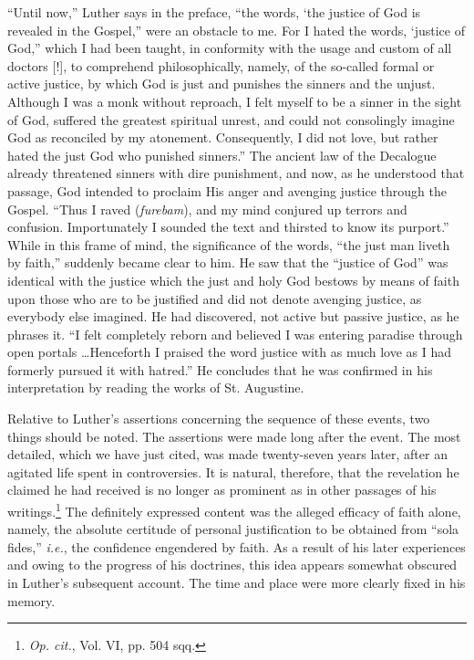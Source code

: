 “Until now,” Luther says in the preface, “the words, ‘the justice
of God is revealed in the Gospel,” were an obstacle to me. For I hated
the words, ‘justice of God,” which I had been taught, in conformity
with the usage and custom of all doctors [!], to comprehend philosophically,
namely, of the so-called formal or active justice, by which
God is just and punishes the sinners and the unjust. Although I was
a monk without reproach, I felt myself to be a sinner in the sight of
God, suffered the greatest spiritual unrest, and could not consolingly
imagine God as reconciled by my atonement. Consequently, I did not
love, but rather hated the just God who punished sinners.” The ancient
law of the Decalogue already threatened sinners with dire punishment, and now, as he understood that passage, God intended to
proclaim His anger and avenging justice through the Gospel. “Thus
I raved (\textit{furebam}), and my mind conjured up terrors and confusion.
Importunately I sounded the text and thirsted to know its purport.”
While in this frame of mind, the significance of the words, “the just
man liveth by faith,” suddenly became clear to him. He saw that the
“justice of God” was identical with the justice which the just and
holy God bestows by means of faith upon those who are to be justified and
did not denote avenging justice, as everybody else imagined.
He had discovered, not active but passive justice, as he phrases it.
“I felt completely reborn and believed I was entering paradise
through open portals \dots Henceforth I praised the word justice
with as much love as I had formerly pursued it with hatred.” He
concludes that he was confirmed in his interpretation by reading the
works of St. Augustine.

Relative to Luther’s assertions concerning the sequence of these
events, two things should be noted. The assertions were made long
after the event. The most detailed, which we have just cited, was
made twenty-seven years later, after an agitated life spent in controversies.
It is natural, therefore, that the revelation he claimed he
had received is no longer as prominent as in other passages of his
writings.\footnote{\textit{Op. cit.}, Vol. VI, pp. 504 sqq.}
The definitely expressed content was the alleged efficacy of
faith alone, namely, the absolute certitude of personal justification to
be obtained from “sola fides,” \textit{i.e.}, the confidence engendered by faith.
As a result of his later experiences and owing to the progress of his
doctrines, this idea appears somewhat obscured in Luther’s subsequent
account. The time and place were more clearly fixed in his memory.

